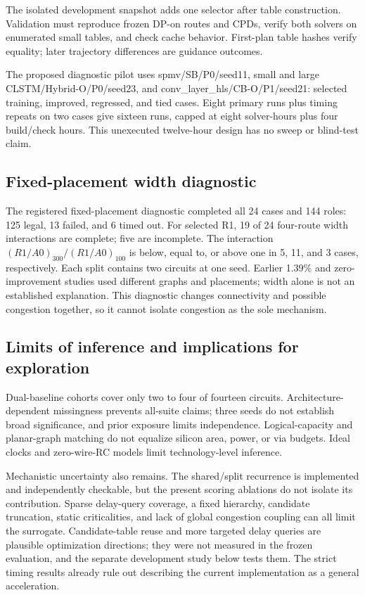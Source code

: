 \documentclass[conference,10pt]{IEEEtran}
\begin{document}
The isolated development snapshot adds one selector after table construction. Validation must reproduce frozen DP-on routes and CPDs, verify both solvers on enumerated small tables, and check cache behavior. First-plan table hashes verify equality; later trajectory differences are guidance outcomes.

The proposed diagnostic pilot uses spmv/SB/P0/seed11, small and large CLSTM/Hybrid-O/P0/seed23, and conv\_layer\_hls/CB-O/P1/seed21: selected training, improved, regressed, and tied cases. Eight primary runs plus timing repeats on two cases give sixteen runs, capped at eight solver-hours plus four build/check hours. This unexecuted twelve-hour design has no sweep or blind-test claim.

\subsection{Fixed-placement width diagnostic}
The registered fixed-placement diagnostic completed all 24 cases and 144 roles: 125 legal, 13 failed, and 6 timed out. For selected R1, 19 of 24 four-route width interactions are complete; five are incomplete. The interaction $(R1/A0)_{300}/(R1/A0)_{100}$ is below, equal to, or above one in 5, 11, and 3 cases, respectively. Each split contains two circuits at one seed. Earlier 1.39\% and zero-improvement studies used different graphs and placements; width alone is not an established explanation. This diagnostic changes connectivity and possible congestion together, so it cannot isolate congestion as the sole mechanism.

\subsection{Limits of inference and implications for exploration}
Dual-baseline cohorts cover only two to four of fourteen circuits. Architecture-dependent missingness prevents all-suite claims; three seeds do not establish broad significance, and prior exposure limits independence. Logical-capacity and planar-graph matching do not equalize silicon area, power, or via budgets. Ideal clocks and zero-wire-RC models limit technology-level inference.

Mechanistic uncertainty also remains. The shared/split recurrence is implemented and independently checkable, but the present scoring ablations do not isolate its contribution. Sparse delay-query coverage, a fixed hierarchy, candidate truncation, static criticalities, and lack of global congestion coupling can all limit the surrogate. Candidate-table reuse and more targeted delay queries are plausible optimization directions; they were not measured in the frozen evaluation, and the separate development study below tests them. The strict timing results already rule out describing the current implementation as a general acceleration.
\end{document}
